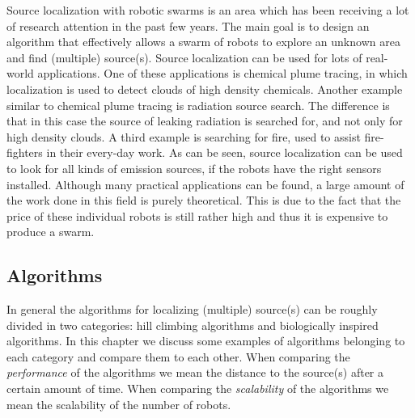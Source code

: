 
Source localization with robotic swarms is an area which has been receiving a lot of research attention in the past few years. 
The main goal is to design an algorithm that effectively allows a swarm of robots to explore an unknown area and find (multiple) source(s).
Source localization can be used for lots of real-world applications.
One of these applications is chemical plume tracing, in which localization is used to detect clouds of high density chemicals. \cite{zarzhitsky2005distributed}
Another example similar to chemical plume tracing is radiation source search. \cite{bashyal2008human} 
The difference is that in this case the source of leaking radiation is searched for, and not only for high density clouds. 
A third example is searching for fire, used to assist fire-fighters in their every-day work. \cite{marjovi2009multi}
As can be seen, source localization can be used to look for all kinds of emission sources, if the robots have the right sensors installed. \cite{cui2004swarm}
Although many practical applications can be found, a large amount of the work done in this field is purely theoretical.
This is due to the fact that the price of these individual robots is still rather high and thus it is expensive to produce a swarm.


\subsection{Algorithms}
In general the algorithms for localizing (multiple) source(s) can be roughly divided in two categories: hill climbing algorithms and biologically inspired algorithms.
In this chapter we discuss some examples of algorithms belonging to each category and compare them to each other.
When comparing the \emph{performance} of the algorithms we mean the distance to the source(s) after a certain amount of time. When comparing the \emph{scalability} of the algorithms we mean the scalability of the number of robots.

